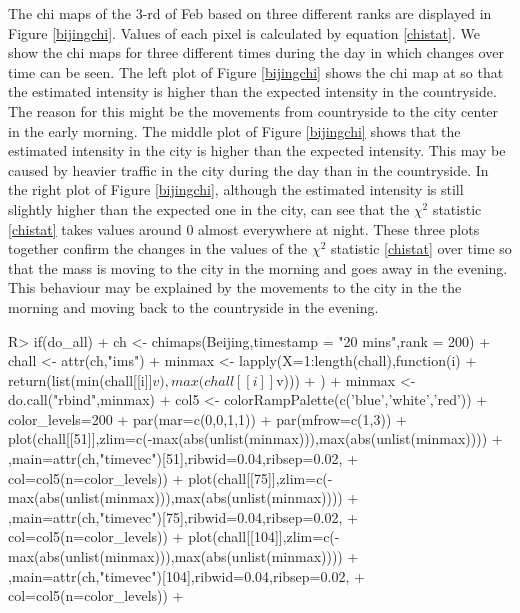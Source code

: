 \documentclass[article]{jss}
\begin{document}
  The chi maps of the $3$-rd of Feb based on three different ranks are displayed in Figure \ref{bijingchi}. Values of each pixel is calculated by equation \eqref{chistat}.  We show the chi maps for three different times during the day in which changes over time can be seen. The left plot of Figure \ref{bijingchi} shows the chi map at  so that the estimated intensity is higher than the expected intensity in the countryside. The reason for this might be the movements from countryside to the city center in the early morning. The middle plot of Figure \ref{bijingchi} shows that the estimated intensity in the city is higher than the expected intensity. This may be caused  by heavier traffic in the city during the day than in the countryside. In the right plot of Figure \ref{bijingchi}, although the estimated intensity is still slightly higher than the expected one in the city, can see that the $\chi^2$ statistic \eqref{chistat} takes values around $0$ almost everywhere at night. These three plots together confirm the changes in the values of the $\chi^2$ statistic \eqref{chistat} over time so that the mass is moving to the city in the morning and goes away in the evening. This behaviour may be explained by the movements to the city in the the morning and moving back to the countryside in the evening.

\begin{Schunk}
\begin{Sinput}
R>  if(do_all){
+  ch <- chimaps(Beijing,timestamp = "20 mins",rank = 200)
+   chall <- attr(ch,"ims")
+   minmax <- lapply(X=1:length(chall),function(i){
+       return(list(min(chall[[i]]$v),max(chall[[i]]$v)))
+     })
+   minmax <- do.call("rbind",minmax)
+   col5 <- colorRampPalette(c('blue','white','red'))
+   color_levels=200 
+   par(mar=c(0,0,1,1))
+   par(mfrow=c(1,3))
+   plot(chall[[51]],zlim=c(-max(abs(unlist(minmax))),max(abs(unlist(minmax))))
+             ,main=attr(ch,"timevec")[51],ribwid=0.04,ribsep=0.02,
+             col=col5(n=color_levels))
+   plot(chall[[75]],zlim=c(-max(abs(unlist(minmax))),max(abs(unlist(minmax))))
+             ,main=attr(ch,"timevec")[75],ribwid=0.04,ribsep=0.02,
+             col=col5(n=color_levels))
+   plot(chall[[104]],zlim=c(-max(abs(unlist(minmax))),max(abs(unlist(minmax))))
+             ,main=attr(ch,"timevec")[104],ribwid=0.04,ribsep=0.02,
+             col=col5(n=color_levels))
+   }
\end{Sinput}
\end{Schunk}
\end{document}
